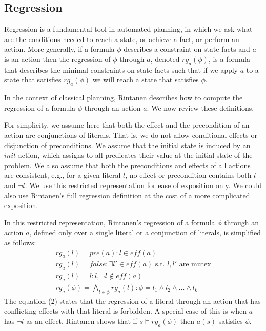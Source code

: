 \documentclass[letterpaper]{article}
\newcommand\roni[1]{\textcolor{blue}{roni: #1}}
\newcommand\guy[1]{\textcolor{red}{guy: #1}}
\theoremstyle{definition}
\begin{document}
\subsection{Regression}
Regression is a fundamental tool in automated planning, in which we ask what are the conditions needed to reach a state, or achieve a fact, or perform an action. More generally, if a formula $\phi$ describes a constraint on state facts and $a$ is an action then the regression of $\phi$ through $a$, denoted $rg_a(\phi)$, is a formula that describes the minimal constraints on state facts such that if we apply $a$ to a state that satisfies $rg_a(\phi)$ we will reach a state  that satisfies $\phi$. 


In the context of classical planning, Rintanen  describes how to compute the regression of a formula $\phi$ through an action $a$. We now review these definitions.  


For simplicity, we assume here that both the effect and the precondition of an action are conjunctions of literals. That is, we do not allow conditional effects or disjunction of preconditions. We assume that the initial state is induced by an $init$ action, which assigns to all predicates their value at the initial state of the problem. We also assume that both the preconditions and effects of all actions are consistent, e.g., for a given literal $l$, no effect or precondition contains both $l$ and $\neg l$. We use this restricted representation for ease of exposition only. We could also use Rintanen's full regression definition at the cost of a more complicated exposition. %

In this restricted representation, Rintanen's regression of a formula $\phi$ through an action $a$, defined only over a single literal or a conjunction of literals, is simplified as follows: %
\begin{align}
&rg_a(l)=  pre(a)  :  l \in eff(a)&\\
&rg_a(l)= false   :  \exists l' \in eff(a) \mbox{ s.t. } l,l' \mbox{ are mutex}&\\
&rg_a(l)= l  :  l,\neg l \not\in eff(a)&\\
&rg_a(\phi)=  \bigwedge_{l \in \phi} rg_a(l)  :  \phi = l_1 \wedge l_2 \wedge ... \wedge l_k &
\end{align}
The equation (2) states that the regression of a literal through an action that has conflicting effects with that literal is forbidden. A special case of this is when $a$ has $\neg l$ as an effect. Rintanen shows that if $s \models rg_a(\phi)$ then $a(s)$ satisfies $\phi$. 
\end{document}
